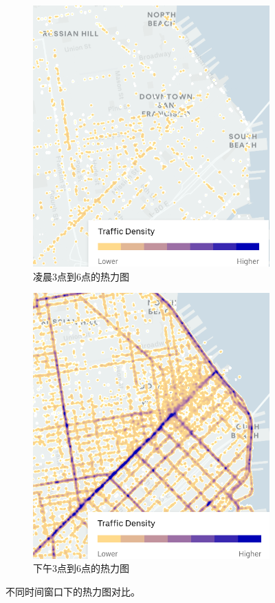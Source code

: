 \begin{figure}[t!]
	\centering
	\begin{subfigure}{0.4\linewidth}
		\centering
		\includegraphics[width=0.8\linewidth]{figures/3a-6a-2020q1-RoadHeatmap-sanfrancisc.png}
		\caption{凌晨3点到6点的热力图}
		\label{subfig:morning_heatmap}
	\end{subfigure}
	\hspace{1em}
	\begin{subfigure}{0.4\linewidth}
		\centering
		\includegraphics[width=0.8\linewidth]{figures/3p-6p-2020q1-RoadHeatmap-sanfrancisc.png}
		\caption{下午3点到6点的热力图}
		\label{subfig:afternoon_heatmap}
	\end{subfigure}
	\caption{不同时间窗口下的热力图对比。}
	\label{fig:temporal_heatmap}
\end{figure}

